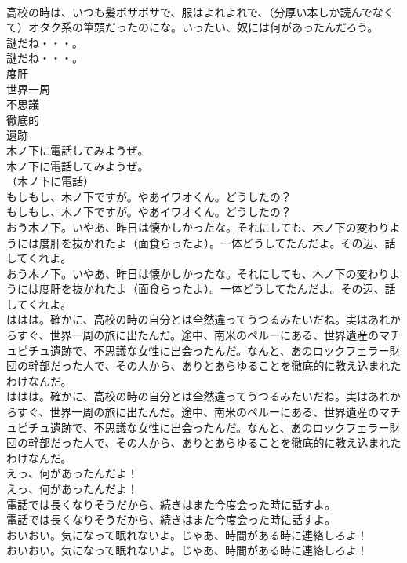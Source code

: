 \documentclass[8pt]{extreport}
\begin{document}
\begin{CJK}{UTF8}{min}
\\	高校の時は、いつも髪ボサボサで、服はよれよれで、（分厚い本しか読んでなくて）オタク系の筆頭だったのにな。いったい、奴には何があったんだろう。 
\\	謎だね・・・。	
\\	謎だね・・・。 
\\	度肝
\\	世界一周
\\	不思議
\\	徹底的
\\	遺跡
\\	木ノ下に電話してみようぜ。	
\\	木ノ下に電話してみようぜ。 
\\	（木ノ下に電話）	
\\	もしもし、木ノ下ですが。やあイワオくん。どうしたの？	
\\	もしもし、木ノ下ですが。やあイワオくん。どうしたの？ 
\\	おう木ノ下。いやあ、昨日は懐かしかったな。それにしても、木ノ下の変わりようには度肝を抜かれたよ（面食らったよ）。一体どうしてたんだよ。その辺、話してくれよ。	
\\	おう木ノ下。いやあ、昨日は懐かしかったな。それにしても、木ノ下の変わりようには度肝を抜かれたよ（面食らったよ）。一体どうしてたんだよ。その辺、話してくれよ。 
\\	ははは。確かに、高校の時の自分とは全然違ってうつるみたいだね。実はあれからすぐ、世界一周の旅に出たんだ。途中、南米のペルーにある、世界遺産のマチュピチュ遺跡で、不思議な女性に出会ったんだ。なんと、あのロックフェラー財団の幹部だった人で、その人から、ありとあらゆることを徹底的に教え込まれたわけなんだ。	
\\	ははは。確かに、高校の時の自分とは全然違ってうつるみたいだね。実はあれからすぐ、世界一周の旅に出たんだ。途中、南米のペルーにある、世界遺産のマチュピチュ遺跡で、不思議な女性に出会ったんだ。なんと、あのロックフェラー財団の幹部だった人で、その人から、ありとあらゆることを徹底的に教え込まれたわけなんだ。 
\\	えっ、何があったんだよ！	
\\	えっ、何があったんだよ！ 
\\	電話では長くなりそうだから、続きはまた今度会った時に話すよ。	
\\	電話では長くなりそうだから、続きはまた今度会った時に話すよ。 
\\	おいおい。気になって眠れないよ。じゃあ、時間がある時に連絡しろよ！	
\\	おいおい。気になって眠れないよ。じゃあ、時間がある時に連絡しろよ！ 

\end{CJK}
\end{document}
